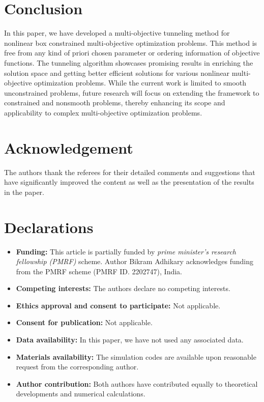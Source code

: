 \documentclass[amsa]{ipart}
\theoremstyle{plain}
\numberwithin{equation}{section}
\begin{document}
\section{Conclusion}\label{(sec_con)}
In this paper, we have developed a multi-objective tunneling method for nonlinear box constrained multi-objective optimization problems. This method is free from any kind of priori chosen parameter or ordering information of objective functions. The tunneling algorithm showcases promising results in enriching the solution space and getting better efficient solutions for various nonlinear multi-objective optimization problems. While the current work is limited to smooth unconstrained problems, future research will focus on extending the framework to constrained and nonsmooth problems, thereby enhancing its scope and applicability to complex multi-objective optimization problems.
\section*{Acknowledgement} The authors thank the referees for their detailed comments and suggestions that have significantly improved the content as well as the presentation of the results in the paper.
\section*{Declarations}
\begin{itemize}
\item {\bf Funding:} This article is partially funded by {\it prime minister's research fellowship (PMRF)} scheme. Author Bikram Adhikary acknowledges funding from the PMRF scheme (PMRF ID. 2202747), India.
\item {\bf Competing interests:} The authors declare no competing interests.
\item {\bf Ethics approval and consent to participate:} Not applicable.
\item {\bf Consent for publication:} Not applicable.
\item {\bf Data availability:} In this paper, we have not used any associated data. 
\item {\bf Materials availability:} The simulation codes are available upon reasonable request from the corresponding author.
\item {\bf Author contribution:} Both authors have contributed equally to theoretical developments and numerical calculations.
\end{itemize}
 
%

\end{document}
